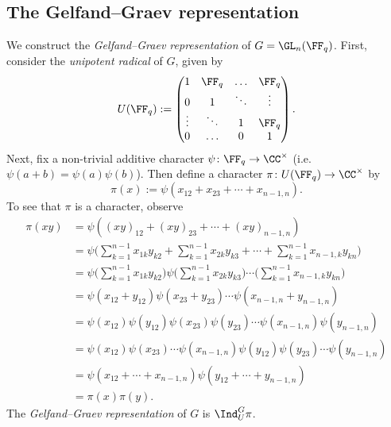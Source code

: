 \subsection{The Gelfand--Graev representation}\label{Section2.4}
We construct the \emph{Gelfand--Graev representation} of $G=\GL_n(\FF_q)$.
First, consider the \emph{unipotent radical} of $G$, given by
\[
	U(\FF_q) := \begin{pmatrix}
		1      & \FF_q  & \hdots & \FF_q  \\
		0      & 1      & \ddots & \vdots \\
		\vdots & \ddots & 1      & \FF_q  \\
		0      & \hdots & 0      & 1
	\end{pmatrix}.
\]
Next, fix a non-trivial additive character $\psi\colon \FF_q\to\CC^\times$ (i.e.\ $\psi(a+b)=\psi(a)\psi(b)$).
Then define a character $\pi\colon U(\FF_q)\to\CC^\times$ by
\[
	\pi(x) := \psi(x_{12}+x_{23}+\cdots+x_{n-1,n}).
\]
To see that $\pi$ is a character, observe
\begin{align*}
	\pi(xy) & = \psi((xy)_{12} + (xy)_{23} + \cdots + (xy)_{n-1,n})                                                                                          \\
	        & = \psi\bigg(\sum_{k=1}^{n-1} x_{1k}y_{k2} + \sum_{k=1}^{n-1} x_{2k}y_{k3} + \cdots + \sum_{k=1}^{n-1} x_{n-1,k}y_{kn}\bigg)                    \\
	        & = \psi\bigg(\sum_{k=1}^{n-1} x_{1k}y_{k2}\bigg)\psi\bigg(\sum_{k=1}^{n-1} x_{2k}y_{k3}\bigg)\cdots\bigg(\sum_{k=1}^{n-1} x_{n-1,k}y_{kn}\bigg) \\
	        & = \psi(x_{12}+y_{12})\psi(x_{23}+y_{23})\cdots\psi(x_{n-1,n}+y_{n-1,n})                                                                        \\
	        & = \psi(x_{12})\psi(y_{12})\psi(x_{23})\psi(y_{23})\cdots\psi(x_{n-1,n})\psi(y_{n-1,n})                                                         \\
	        & = \psi(x_{12})\psi(x_{23})\cdots\psi(x_{n-1,n})\psi(y_{12})\psi(y_{23})\cdots\psi(y_{n-1,n})                                                   \\
	        & = \psi(x_{12} + \cdots + x_{n-1,n})\psi(y_{12} + \cdots + y_{n-1,n})                                                                           \\
	        & = \pi(x)\pi(y).
\end{align*}
The \emph{Gelfand--Graev representation} of $G$ is $\Ind_U^G \pi$.
